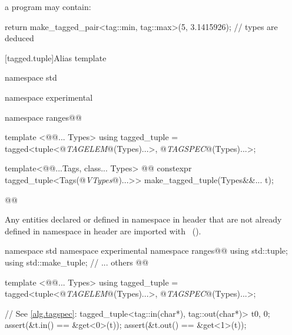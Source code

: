{\begin{itemdescr}
a \Cpp program may contain:

\begin{codeblock}
  return make_tagged_pair<tag::min, tag::max>(5, 3.1415926);           // types are deduced
\end{codeblock}
\exitexample
\end{itemdescr}

{\color{addclr}
[tagged.tuple]{Alias template }


\begin{codeblock}
namespace std { namespace experimental { namespace ranges@@ {
  template <@@... Types>
  using tagged_tuple = tagged<tuple<@\textit{TAGELEM}@(Types)...>,
                              @\textit{TAGSPEC}@(Types)...>;

  template<@@...Tags, class... Types>
    @@
      constexpr tagged_tuple<Tags(@\textit{VTypes}@)...>> make_tagged_tuple(Types&&... t);
}}}@\newtxt{\}}@
\end{codeblock}

\pnum
Any entities declared or defined in namespace  in header 
that are not already defined in namespace  in header
 are imported with
~(). \enterexample
\begin{codeblock}
namespace std { namespace experimental { namespace ranges@@ {
  using std::tuple;
  using std::make_tuple;
  // ... others
}}}@\newtxt{\}}@
\end{codeblock}
\exitexample
}

\begin{codeblock}
template <@@... Types>
using tagged_tuple = tagged<tuple<@\textit{TAGELEM}@(Types)...>,
                            @\textit{TAGSPEC}@(Types)...>;
\end{codeblock}

\pnum {}

\pnum \enterexample
\begin{codeblock}
// See \ref{alg.tagspec}:
tagged_tuple<tag::in(char*), tag::out(char*)> t{0, 0};
assert(&t.in() == &get<0>(t));
assert(&t.out() == &get<1>(t));
\end{codeblock}
\exitexample

}
